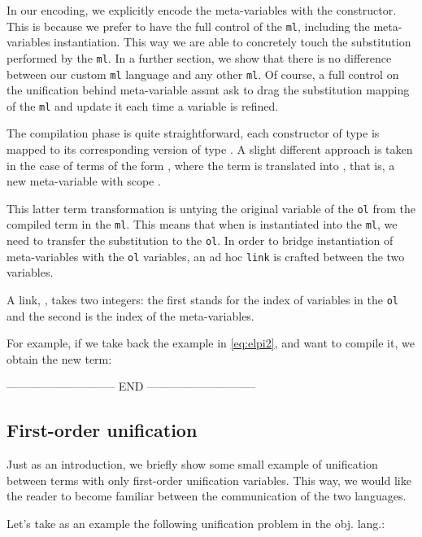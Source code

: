 \documentclass[acmengage]{acmart}
\newcommand*{\acronym}[1]{\texttt{#1}\xspace}
\def\ol{\acronym{ol}} %
\def\ml{\acronym{ml}} %
\begin{document}
In our encoding, we explicitly encode the meta-variables with the 
constructor. This is because we prefer to have the full control of the \ml,
including the meta-variables instantiation. This way we are able to concretely
touch the substitution performed by the \ml. In a further section, we show that
there is no difference between our custom \ml language and any other \ml. Of
course, a full control on the unification behind meta-variable assmt ask to
drag the substitution mapping of the \ml and update it each time a variable is
refined.

The compilation phase is quite straightforward, each constructor of type
 is mapped to its corresponding version of type . A
slight different approach is taken in the case of terms of the form , where the term is translated into , that is, a
new meta-variable  with scope .

This latter term transformation is untying the original variable  of
the \ol from the compiled term in the \ml. This means that when  is
instantiated into the \ml, we need to transfer the substitution to the \ol. In
order to bridge instantiation of meta-variables with the \ol variables, an ad
hoc \texttt{link} is crafted between the two variables.

A link, , takes two integers: the first 
stands for the index of variables in the \ol and the second is the index of 
the meta-variables.

For example, if we take back the example in \cref{eq:elpi2}, and want to compile
it, we obtain the new term:




----------------------------- END -----------------------------
\subsection{First-order unification}

Just as an introduction, we briefly show some small example of unification
between terms with only first-order unification variables. This way, we would
like the reader to become familiar between the communication of the two
languages.

Let's take as an example the following unification problem in the obj. lang.: 
\end{document}
